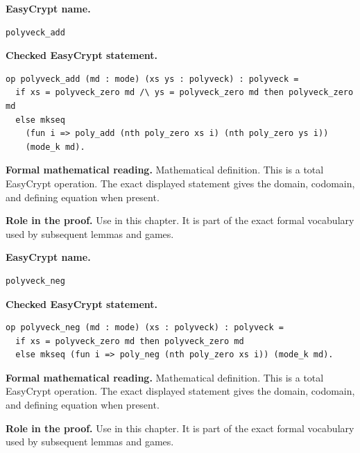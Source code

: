 \begin{formaldefinition}
\noindent\textbf{EasyCrypt name.}
\begin{lstlisting}[language=EasyCrypt,basicstyle=\ttfamily\scriptsize]
polyveck_add
\end{lstlisting}
\noindent\textbf{Checked EasyCrypt statement.}
\begin{lstlisting}[language=EasyCrypt,basicstyle=\ttfamily\scriptsize]
op polyveck_add (md : mode) (xs ys : polyveck) : polyveck =
  if xs = polyveck_zero md /\ ys = polyveck_zero md then polyveck_zero md
  else mkseq
    (fun i => poly_add (nth poly_zero xs i) (nth poly_zero ys i))
    (mode_k md).
\end{lstlisting}
\noindent\textbf{Formal mathematical reading.}
Mathematical definition. This is a total EasyCrypt operation.  The exact displayed statement gives the domain, codomain, and defining equation when present.

\noindent\textbf{Role in the proof.}
Use in this chapter. It is part of the exact formal vocabulary used by subsequent lemmas and games.

\end{formaldefinition}

\begin{formaldefinition}
\noindent\textbf{EasyCrypt name.}
\begin{lstlisting}[language=EasyCrypt,basicstyle=\ttfamily\scriptsize]
polyveck_neg
\end{lstlisting}
\noindent\textbf{Checked EasyCrypt statement.}
\begin{lstlisting}[language=EasyCrypt,basicstyle=\ttfamily\scriptsize]
op polyveck_neg (md : mode) (xs : polyveck) : polyveck =
  if xs = polyveck_zero md then polyveck_zero md
  else mkseq (fun i => poly_neg (nth poly_zero xs i)) (mode_k md).
\end{lstlisting}
\noindent\textbf{Formal mathematical reading.}
Mathematical definition. This is a total EasyCrypt operation.  The exact displayed statement gives the domain, codomain, and defining equation when present.

\noindent\textbf{Role in the proof.}
Use in this chapter. It is part of the exact formal vocabulary used by subsequent lemmas and games.

\end{formaldefinition}


